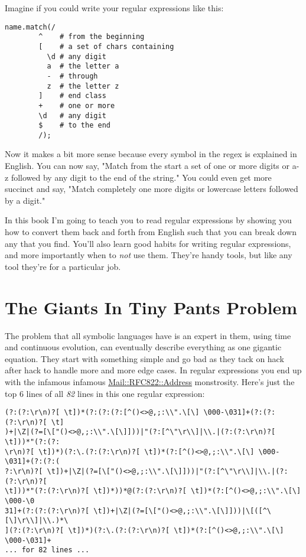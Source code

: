 Imagine if you could write your regular expressions like this:

\begin{lstlisting}
name.match(/
        ^    # from the beginning
        [    # a set of chars containing
          \d # any digit
          a  # the letter a
          -  # through
          z  # the letter z
        ]    # end class
        +    # one or more
        \d   # any digit
        $    # to the end
        /);
\end{lstlisting}

Now it makes a bit more sense because every symbol in the regex is explained in
English.  You can now say, "Match from the start a set of one or more digits or
a-z followed by any digit to the end of the string." You could even get more
succinct and say, "Match completely one more digits or lowercase letters
followed by a digit."

In this book I'm going to teach you to read regular expressions by showing you how
to convert them back and forth from English such that you can break down any that you
find.  You'll also learn good habits for writing regular expressions, and more importantly
when to \emph{not} use them.  They're handy tools, but like any tool they're for
a particular job.

\section{The Giants In Tiny Pants Problem}

The problem that all symbolic languages have is an expert in them, using time
and continuous evolution, can eventually describe everything as one gigantic
equation.  They start with something simple and go bad as they tack on hack
after hack to handle more and more edge cases.  In regular
expressions you end up with the infamous infamous
\href{http://www.ex-parrot.com/pdw/Mail-RFC822-Address.html}{Mail::RFC822::Address}
monstrosity.  Here's just the top 6 lines of all \emph{82} lines in this
one regular expression:

\begin{lstlisting}
(?:(?:\r\n)?[ \t])*(?:(?:(?:[^()<>@,;:\\".\[\] \000-\031]+(?:(?:(?:\r\n)?[ \t]
)+|\Z|(?=[\["()<>@,;:\\".\[\]]))|"(?:[^\"\r\\]|\\.|(?:(?:\r\n)?[ \t]))*"(?:(?:
\r\n)?[ \t])*)(?:\.(?:(?:\r\n)?[ \t])*(?:[^()<>@,;:\\".\[\] \000-\031]+(?:(?:(
?:\r\n)?[ \t])+|\Z|(?=[\["()<>@,;:\\".\[\]]))|"(?:[^\"\r\\]|\\.|(?:(?:\r\n)?[ 
\t]))*"(?:(?:\r\n)?[ \t])*))*@(?:(?:\r\n)?[ \t])*(?:[^()<>@,;:\\".\[\] \000-\0
31]+(?:(?:(?:\r\n)?[ \t])+|\Z|(?=[\["()<>@,;:\\".\[\]]))|\[([^\[\]\r\\]|\\.)*\
](?:(?:\r\n)?[ \t])*)(?:\.(?:(?:\r\n)?[ \t])*(?:[^()<>@,;:\\".\[\] \000-\031]+
... for 82 lines ...
\end{lstlisting}

